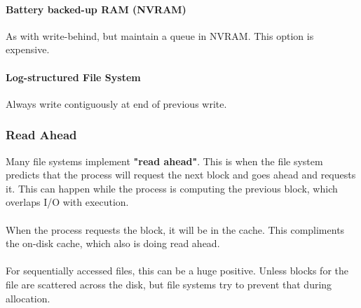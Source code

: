 \documentclass{article}
\begin{document}
\paragraph{Battery backed-up RAM (NVRAM)} As with write-behind, but maintain a queue in NVRAM. This option is expensive.

\paragraph{Log-structured File System} Always write contiguously at end of previous write.

\subsubsection{Read Ahead}

Many file systems implement \textbf{"read ahead"}. This is when the file system predicts that the process will request the next block and goes ahead and requests it. This can happen while the process is computing the previous block, which overlaps I\slash O with execution.
\\
\\
When the process requests the block, it will be in the cache. This compliments the on-disk cache, which also is doing read ahead.
\\
\\
For sequentially accessed files, this can be a huge positive. Unless blocks for the file are scattered across the disk, but file systems try to prevent that during allocation.

\newpage
\end{document}
